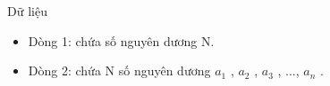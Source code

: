 Dữ liệu
\begin{itemize}
	\item     Dòng 1: chứa số nguyên dương N.   
	\item     Dòng 2: chứa N số nguyên dương $a_{1}$    , $a_{2}$    , $a_{3}$    , ..., $a_{n}$    .   
\end{itemize}